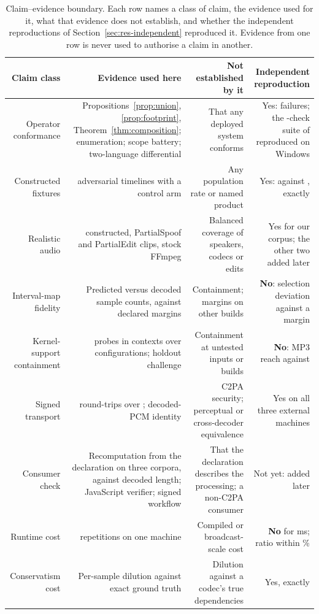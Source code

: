 \documentclass[preprint,3p,11pt,authoryear]{elsarticle}
\begin{document}
\begin{table}[tbp]
\centering
\caption{Claim--evidence boundary. Each row names a class of
claim, the evidence used for it, what that evidence does not establish, and whether
the independent reproductions of Section~\ref{sec:res-independent} reproduced
it. Evidence from one row is
never used to authorise a claim in another.}
\label{tab:boundary}
\footnotesize
\begin{tabular}{R{0.15}R{0.26}R{0.23}R{0.23}}
\toprule
Claim class & Evidence used here & Not established by it & Independent reproduction \\
\midrule
Operator conformance &
Propositions~\ref{prop:union}, \ref{prop:footprint}, Theorem~\ref{thm:composition};
enumeration; scope battery; two-language differential &
That any deployed system conforms &
Yes: \IRafailed{} failures; the \XBWinChecks{}-check suite of \XBWinTag{} reproduced on Windows \\
\addlinespace
Constructed fixtures &
\Btimelines{} adversarial timelines with a control arm &
Any population rate or named product &
Yes: \BbaseOne{} against \BemAll{}, exactly \\
\addlinespace
Realistic audio &
\Cclips{} constructed, \Qclips{} PartialSpoof and \Rclips{} PartialEdit clips, stock FFmpeg &
Balanced coverage of speakers, codecs or edits &
Yes for our corpus; the other two added later \\
\addlinespace
Interval-map fidelity &
Predicted versus decoded sample counts, against declared margins &
Containment; margins on other builds &
\textbf{No}: selection deviation \IRsilDev{} against a \IRsilGuard{} margin \\
\addlinespace
Kernel-support containment &
\Kprobes{} probes in \Kcontexts{} contexts over \Kops{} configurations; holdout
challenge &
Containment at untested inputs or builds &
\textbf{No}: MP3 reach \IRmpReach{} against \IRmpDeclared{} \\
\addlinespace
Signed transport &
\Ftotal{} round-trips over \Fcontainerlist{}; decoded-PCM identity &
C2PA security; perceptual or cross-decoder equivalence &
Yes on all three external machines \\
\addlinespace
Consumer check &
Recomputation from the declaration on three corpora, against decoded length;
JavaScript verifier; signed workflow &
That the declaration describes the processing; a non-C2PA consumer &
Not yet: added later \\
\addlinespace
Runtime cost &
\Greps{} repetitions on one machine &
Compiled or broadcast-scale cost &
\textbf{No} for ms; ratio within \IRratioGap{}\% \\
\addlinespace
Conservatism cost &
Per-sample dilution against exact ground truth &
Dilution against a codec's true dependencies &
Yes, exactly \\
\bottomrule
\end{tabular}
\end{table}
\end{document}
